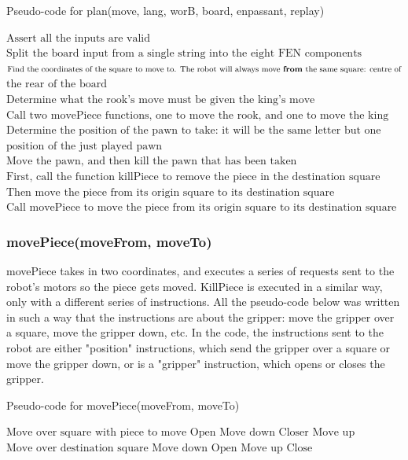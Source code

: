 \documentclass[onecolumn]{IEEEtran}
\begin{document}
\begin{algorithm}[H]
\caption{Pseudo-code for plan(move, lang, worB, board, enpassant, replay)}
\begin{algorithmic}[1]
\STATE $\text{Assert all the inputs are valid}$
\STATE $\text{Split the board input from a single string into the eight FEN components}$
\STATE $\text{Find the coordinates of the square to move to. The robot will always move \textbf{from} the same square: centre of}$
\STATEx $\text{the rear of the board}$
\STATE $\text{Determine what the rook's move must be given the king's move}$
\STATE $\text{Call two movePiece functions, one to move the rook, and one to move the king}$
\STATE $\text{Determine the position of the pawn to take: it will be the same letter but one number off the destination}$
\STATEx $\text{position of the just played pawn}$
\STATE $\text{Move the pawn, and then kill the pawn that has been taken}$
\STATE $\text{First, call the function killPiece to remove the piece in the destination square}$
\STATE $\text{Then move the piece from its origin square to its destination square}$
\ELSE
\STATE $\text{Call movePiece to move the piece from its origin square to its destination square}$
\ENDIF
\end{algorithmic}
\end{algorithm}

\subsubsection{movePiece(moveFrom, moveTo)}
movePiece takes in two coordinates, and executes a series of requests sent to the robot's motors so the piece gets moved. KillPiece is executed in a similar way, only with a different series of instructions. \newline
All the pseudo-code below was written in such a way that the instructions are about the gripper: move the gripper over a square, move the gripper down, etc. In the code, the instructions sent to the robot are either "position" instructions, which send the gripper over a square or move the gripper down, or is a "gripper" instruction, which opens or closes the gripper. 

\begin{algorithm}[H]
\caption{Pseudo-code for movePiece(moveFrom, moveTo)}
\begin{algorithmic}[1]
\STATE $\text{Move over square with piece to move}$
\STATE $\text{Open}$
\STATE $\text{Move down}$
\STATE $\text{Closer}$
\STATE $\text{Move up}$
\STATE $\text{Move over destination square}$
\STATE $\text{Move down}$
\STATE $\text{Open}$
\STATE $\text{Move up}$
\STATE $\text{Close}$
\end{algorithmic}
\end{algorithm}
\end{document}
